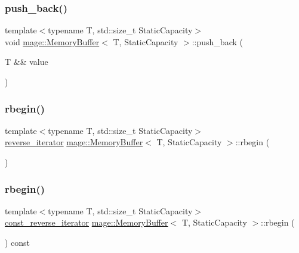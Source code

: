 \subsubsection{\texorpdfstring{push\+\_\+back()}{push\_back()}\hspace{0.1cm}{\footnotesize\ttfamily [2/2]}}
{\footnotesize\ttfamily template$<$typename T, std\+::size\+\_\+t Static\+Capacity$>$ \\
void \mbox{\hyperlink{classmage_1_1_memory_buffer}{mage\+::\+Memory\+Buffer}}$<$ T, Static\+Capacity $>$\+::push\+\_\+back (\begin{DoxyParamCaption}\item[{T \&\&}]{value }\end{DoxyParamCaption})}

\mbox{\label{classmage_1_1_memory_buffer_a9c2a77b065ea73b897d8f81cb189ad62}} 
\subsubsection{\texorpdfstring{rbegin()}{rbegin()}\hspace{0.1cm}{\footnotesize\ttfamily [1/2]}}
{\footnotesize\ttfamily template$<$typename T, std\+::size\+\_\+t Static\+Capacity$>$ \\
\mbox{\hyperlink{classmage_1_1_memory_buffer_a0ff72cf71e4955a859ed8afd70832c92}{reverse\+\_\+iterator}} \mbox{\hyperlink{classmage_1_1_memory_buffer}{mage\+::\+Memory\+Buffer}}$<$ T, Static\+Capacity $>$\+::rbegin (\begin{DoxyParamCaption}{ }\end{DoxyParamCaption})\hspace{0.3cm}{\ttfamily [noexcept]}}

\mbox{\label{classmage_1_1_memory_buffer_a68cff2f94c26c8c24090b80019388d81}} 
\subsubsection{\texorpdfstring{rbegin()}{rbegin()}\hspace{0.1cm}{\footnotesize\ttfamily [2/2]}}
{\footnotesize\ttfamily template$<$typename T, std\+::size\+\_\+t Static\+Capacity$>$ \\
\mbox{\hyperlink{classmage_1_1_memory_buffer_a95188e283a195d9aa2730deb6b1c1a79}{const\+\_\+reverse\+\_\+iterator}} \mbox{\hyperlink{classmage_1_1_memory_buffer}{mage\+::\+Memory\+Buffer}}$<$ T, Static\+Capacity $>$\+::rbegin (\begin{DoxyParamCaption}{ }\end{DoxyParamCaption}) const\hspace{0.3cm}{\ttfamily [noexcept]}}

